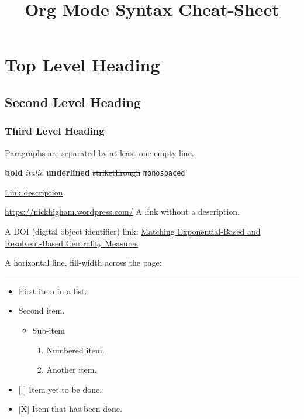 \documentclass[]{article}
\title{Org Mode Syntax Cheat-Sheet}
\date{}
\providecommand{\tightlist}{%
  \setlength{\itemsep}{0pt}\setlength{\parskip}{0pt}}
\begin{document}
\maketitle

\section{Top Level Heading}\label{top-level-heading}

\subsection{Second Level Heading}\label{second-level-heading}

\subsubsection{Third Level Heading}\label{third-level-heading}

Paragraphs are separated by at least one empty line.

\textbf{bold} \emph{italic} \textbf{underlined} \sout{strikethrough}
\texttt{monospaced}

\href{https://nickhigham.wordpress.com/}{Link description}

\url{https://nickhigham.wordpress.com/} A link without a description.

A DOI (digital object identifier) link:
\href{doi:10.1093/comnet/cnv016}{Matching Exponential-Based and
Resolvent-Based Centrality Measures}

A horizontal line, fill-width across the page:

\begin{center}\rule{0.5\linewidth}{\linethickness}\end{center}

\begin{itemize}
\tightlist
\item
  First item in a list.
\item
  Second item.

  \begin{itemize}
  \tightlist
  \item
    Sub-item

    \begin{enumerate}
    \tightlist
    \item
      Numbered item.
    \item
      Another item.
    \end{enumerate}
  \end{itemize}
\item
  {[} {]} Item yet to be done.
\item
  {[}X{]} Item that has been done.
\end{itemize}
\end{document}
